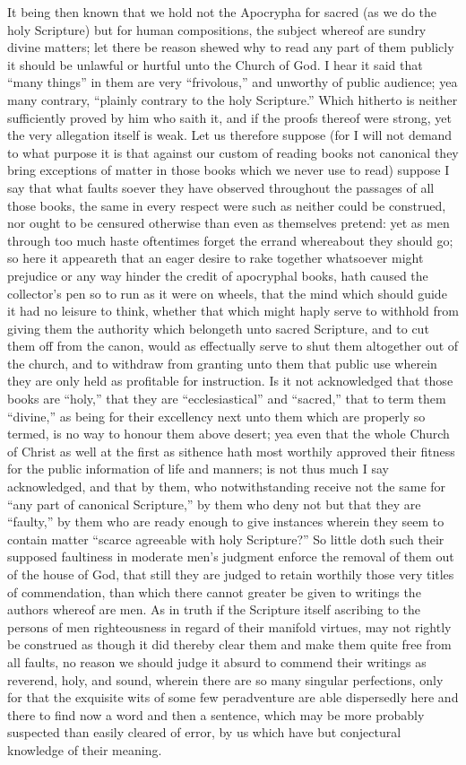 It being then known that we hold not the Apocrypha for sacred (as we do the holy Scripture) but for human compositions, the subject whereof are sundry divine matters; let there be reason shewed why to read any part of them publicly it should be unlawful or hurtful unto the Church of God. I  hear it said that “many things” in them are very “frivolous,” and unworthy of public audience; yea many contrary, “plainly contrary to the holy Scripture.” Which hitherto is neither sufficiently proved by him who saith it, and if the proofs thereof were strong, yet the very allegation itself is weak. Let us therefore suppose (for I will not demand to what purpose it is that against our custom of reading books not canonical they bring exceptions of matter in those books which we never use to read) suppose I say that what faults soever they have observed throughout the passages of all those books, the same in every respect were such as neither could be construed, nor ought to be censured otherwise than even as themselves pretend: yet as men through too much haste oftentimes forget the errand whereabout they should go; so here it appeareth that an eager desire to rake together whatsoever might prejudice or any way hinder the credit of apocryphal books, hath caused the collector’s pen so to run as it were on wheels, that the mind which should guide it had no leisure to think, whether that which might haply serve to withhold from giving them the authority which belongeth unto sacred Scripture, and to cut them off from the canon, would as effectually serve to shut them altogether out of the church, and to withdraw from granting unto them that public use wherein they are only held as profitable for instruction. Is it not acknowledged that those  books are “holy,” that they are “ecclesiastical” and “sacred,” that to term them “divine,” as being for their excellency next unto them which are properly so termed, is no way to honour them above desert; yea even that the whole Church of Christ as well at the first as sithence hath most worthily approved their fitness for the public information of life and manners; is not thus much I say acknowledged, and that by them, who notwithstanding receive not the same for “any part of canonical Scripture,” by them who deny not but that they are “faulty,” by them who are ready enough to give instances wherein they seem to contain matter “scarce agreeable with holy Scripture?” So little doth such their supposed faultiness in moderate men’s judgment enforce the removal of them out of the house of God, that still they are judged to retain worthily those very titles of commendation, than which there cannot greater be given to writings the authors whereof are men. As in truth if the Scripture itself ascribing to the persons of men righteousness in regard of their manifold virtues, may not rightly be construed as though it did thereby clear them and make them quite free from all faults, no reason we should judge it absurd to commend their writings as reverend, holy, and sound, wherein there are so many singular perfections, only for that the exquisite wits of some few peradventure are able dispersedly here and there to find now a word and then a sentence, which may be more probably suspected than easily cleared of error, by us which have but conjectural knowledge of their meaning.
